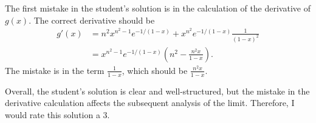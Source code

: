 The first mistake in the student's solution is in the calculation of the derivative of $g(x)$. The correct derivative should be
\begin{align*}
g'(x) &= n^2 x^{n^2-1} e^{-1/(1-x)} + x^{n^2} e^{-1/(1-x)} \frac{1}{(1-x)^2} \\
&= x^{n^2-1} e^{-1/(1-x)} (n^2 - \frac{n^2x}{1-x}).
\end{align*}
The mistake is in the term $\frac{1}{1-x}$, which should be $\frac{n^2x}{1-x}$.

Overall, the student's solution is clear and well-structured, but the mistake in the derivative calculation affects the subsequent analysis of the limit. Therefore, I would rate this solution a 3.
